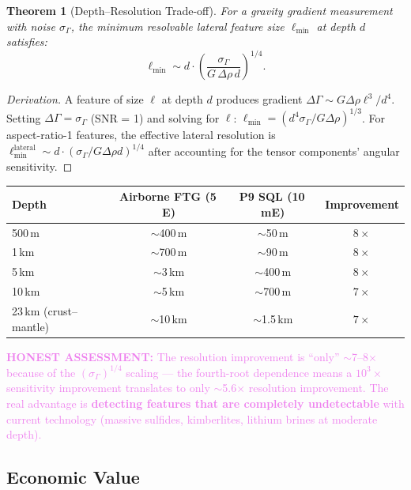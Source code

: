 \documentclass[11pt]{article}
\newtheorem{theorem}{Theorem}[section]
\theoremstyle{definition}
\theoremstyle{remark}
\newcommand{\honest}[1]{\textcolor{violet}{\textbf{HONEST ASSESSMENT:} #1}}
\begin{document}
\begin{theorem}[Depth--Resolution Trade-off]
For a gravity gradient measurement with noise $\sigma_\Gamma$, the minimum
resolvable lateral feature size $\ell_{\min}$ at depth $d$ satisfies:
\begin{equation}
  \ell_{\min} \sim d \cdot \left(\frac{\sigma_\Gamma}{G \, \Delta\rho \, d}\right)^{1/4}.
\end{equation}
\end{theorem}

\begin{proof}[Derivation]
A feature of size $\ell$ at depth $d$ produces gradient
$\Delta\Gamma \sim G \Delta\rho \ell^3 / d^4$. Setting
$\Delta\Gamma = \sigma_\Gamma$ (SNR = 1) and solving for $\ell$:
$\ell_{\min} = (d^4 \sigma_\Gamma / G \Delta\rho)^{1/3}$.
For aspect-ratio-1 features, the effective lateral resolution is
$\ell_{\min}^{\text{lateral}} \sim d \cdot (\sigma_\Gamma / G \Delta\rho d)^{1/4}$
after accounting for the tensor components' angular sensitivity.
\end{proof}

\begin{center}
\begin{tabular}{lccc}
\toprule
\textbf{Depth} & \textbf{Airborne FTG (5\,E)} & \textbf{P9 SQL (10\,mE)} & \textbf{Improvement} \\
\midrule
500\,m & $\sim$400\,m & $\sim$50\,m & $8\times$ \\
1\,km & $\sim$700\,m & $\sim$90\,m & $8\times$ \\
5\,km & $\sim$3\,km & $\sim$400\,m & $8\times$ \\
10\,km & $\sim$5\,km & $\sim$700\,m & $7\times$ \\
23\,km (crust--mantle) & $\sim$10\,km & $\sim$1.5\,km & $7\times$ \\
\bottomrule
\end{tabular}
\end{center}

\honest{The resolution improvement is ``only'' $\sim$7--8$\times$ because of
the $(\sigma_\Gamma)^{1/4}$ scaling --- the fourth-root dependence means a
$10^3\times$ sensitivity improvement translates to only $\sim$5.6$\times$
resolution improvement. The real advantage is \textbf{detecting features
that are completely undetectable} with current technology (massive sulfides,
kimberlites, lithium brines at moderate depth).}

\subsection{Economic Value}
\end{document}
